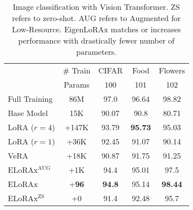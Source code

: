 \begin{table}[!h]
    \caption{Image classification with Vision Transformer. ZS refers to zero-shot. AUG refers to Augmented for Low-Resource. EigenLoRAx matches or increases performance with drastically fewer number of parameters.}
    \begin{center}
    \begin{sc}
    \begin{adjustbox}{width=\columnwidth}
    \begin{tabular}{lcccc}
        \toprule
         & \# Train & CIFAR & Food & Flowers \\
         & Params  & 100 & 101 & 102 \\
        \midrule
        Full Training & 86M  & 97.0 & 96.64 & 98.82 \\
        Base Model &  15K & 90.07 & 90.8 & 80.71 \\
        LoRA ($r=4$)  & +147K & 93.79 & \textbf{95.73} & 95.03  \\
        LoRA ($r=1$)  & +36K  & 92.45 & 91.07 & 90.14  \\
        VeRA & +18K  & 90.87 & 91.75 & 91.25 \\
        \rowcolor{gray!20} ELoRAx$^{\text{AUG}}$ & +1K & 94.4  & 95.01 & 97.5 \\
        \rowcolor{gray!20} ELoRAx & +\textbf{96}  & \textbf{94.8} & 95.14 & \textbf{98.44} \\
        \rowcolor{gray!20} ELoRAx$^{\text{ZS}}$ & +0& 91.4  & 92.48 & 95.7 \\
        \bottomrule
    \end{tabular}
    \label{tab:vision_models}
    \end{adjustbox}
    \end{sc}
    \end{center}
\end{table}
